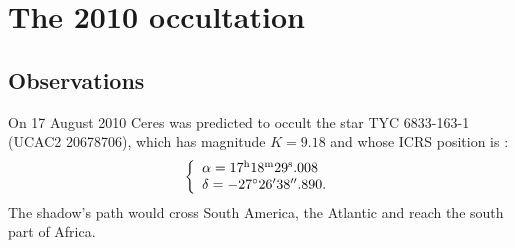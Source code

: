 \documentclass[useAMS,usenatbib]{mn2e}
\begin{document}
\section{The 2010 occultation}

\subsection{Observations}

%
On 17 August 2010 Ceres was predicted to occult the star TYC 6833-163-1 (UCAC2 20678706), which has magnitude $K=9.18$ and whose ICRS position is \citep{Zacharias2004}:
\begin{equation}
\left\{ 
  \begin{array}{l l}
    \alpha = 17^{\text{h}}18^{\text{m}}29^{\text{s}}.008\\
    \delta = -27\hbox{$^\circ$} 26\hbox{$^\prime$} 38\hbox{$^{\prime\prime}$}.890.
  \end{array}
\right.
\label{Eq: 2010-coord}
\end{equation}
%
%
%
The shadow's path would cross South America, the Atlantic and reach the south part of Africa.
\end{document}
